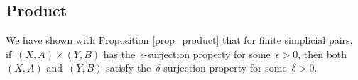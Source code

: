 \documentclass[english,11pt]{article}
\theoremstyle{plain}
\newtheorem{proposition}{Proposition}[section]
\theoremstyle{remark}
\theoremstyle{definition}
\newcommand{\op}[1]{\mathrm{op}(#1)}
\newcommand{\Sp}{\mathbb{S}}
\newcommand{\BB}{\mathbb{B}}
\newcommand{\sus}{\mathsf{S}}
\begin{document}
%
%
%
%


\subsection{Product}
We have shown with Proposition \ref{prop_product} that for finite simplicial pairs, if~$(X,A)\times (Y,B)$ has the~$\epsilon$-surjection property for some~$\epsilon>0$, then both~$(X,A)$ and~$(Y,B)$ satisfy the~$\delta$-surjection property for some~$\delta>0$.
\end{document}
